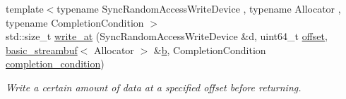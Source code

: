\begin{DoxyCompactItemize}
{\footnotesize template$<$typename Sync\+Random\+Access\+Write\+Device , typename Allocator , typename Completion\+Condition $>$ }\\std\+::size\+\_\+t \hyperlink{group__write__at_ga2e23f5418309ba130d75f6757b7b8e15}{write\+\_\+at} (Sync\+Random\+Access\+Write\+Device \&d, uint64\+\_\+t \hyperlink{group__async__read__at_ga8dcdb41a4adfd6fe5322b5dd666d9f29}{offset}, \hyperlink{classasio_1_1basic__streambuf}{basic\+\_\+streambuf}$<$ Allocator $>$ \&\hyperlink{group__async__read_ga945a5c18fa77a9e2eba420f8f44b2a4f}{b}, Completion\+Condition \hyperlink{group__async__read_gae2e215d5013596cc2b385bb6c13fa518}{completion\+\_\+condition})
\begin{DoxyCompactList}\small\item\em Write a certain amount of data at a specified offset before returning. \end{DoxyCompactList}\end{DoxyCompactItemize}
